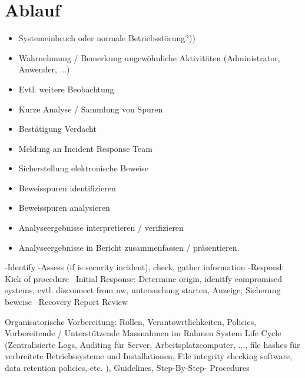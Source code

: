 \section{Ablauf}
\begin{itemize}
  \item Systemeinbruch oder normale Betriebsstörung?))
  \item Wahrnehmung / Bemerkung ungewöhnliche Aktivitäten (Administrator, Anwender, ...)
  \item Evtl. weitere Beobachtung
  \item Kurze Analyse / Sammlung von Spuren
  \item Bestätigung Verdacht
  \item Meldung an Incident Response Team
  \item Sicherstellung elektronische Beweise
  \item Beweisspuren identifizieren
  \item Beweisspuren analysieren
  \item Analyseergebnisse interpretieren / verifizieren
  \item Analyseergebnisse in Bericht zusammenfassen / präsentieren.
\end{itemize}

-Identify
-Assess (if is security incident), check, gather information
-Respond: Kick of procedure
--Initial Response: Determine origin, idenitfy compromised systems, evtl. disconnect from nw, untersuchung starten, Anzeige: Sicherung beweise
--Recovery
Report
Review


Organisatorische Vorbereitung: Rollen, Verantowrtlichkeiten, Policies, Vorbereitende / Unterstützende Massnahmen im Rahmen System Life Cycle (Zentralisierte Logs, Auditing für Server, Arbeitsplatzcomputer, ..., file hashes für verbreitete Betriebssysteme und Installationen, File integrity checking software, data retention policies, etc. ), Guidelines, Step-By-Step- Procedures